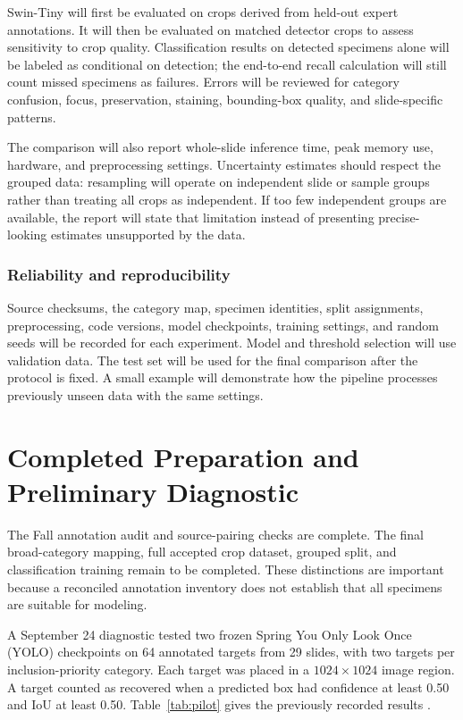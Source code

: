 \documentclass[11pt,letterpaper]{article}
\begin{document}
Swin-Tiny will first be evaluated on crops derived from held-out expert annotations. It will then be evaluated on matched detector crops to assess sensitivity to crop quality. Classification results on detected specimens alone will be labeled as conditional on detection; the end-to-end recall calculation will still count missed specimens as failures. Errors will be reviewed for category confusion, focus, preservation, staining, bounding-box quality, and slide-specific patterns.

The comparison will also report whole-slide inference time, peak memory use, hardware, and preprocessing settings. Uncertainty estimates should respect the grouped data: resampling will operate on independent slide or sample groups rather than treating all crops as independent. If too few independent groups are available, the report will state that limitation instead of presenting precise-looking estimates unsupported by the data.

\subsubsection{Reliability and reproducibility}
Source checksums, the category map, specimen identities, split assignments, preprocessing, code versions, model checkpoints, training settings, and random seeds will be recorded for each experiment. Model and threshold selection will use validation data. The test set will be used for the final comparison after the protocol is fixed. A small example will demonstrate how the pipeline processes previously unseen data with the same settings.

\section{Completed Preparation and Preliminary Diagnostic}
The Fall annotation audit and source-pairing checks are complete. The final broad-category mapping, full accepted crop dataset, grouped split, and classification training remain to be completed. These distinctions are important because a reconciled annotation inventory does not establish that all specimens are suitable for modeling.

A September 24 diagnostic tested two frozen Spring You Only Look Once (YOLO) checkpoints on 64 annotated targets from 29 slides, with two targets per inclusion-priority category. Each target was placed in a $1024\times1024$ image region. A target counted as recovered when a predicted box had confidence at least 0.50 and IoU at least 0.50. Table~\ref{tab:pilot} gives the previously recorded results \citep{pilot2026}.
\end{document}
